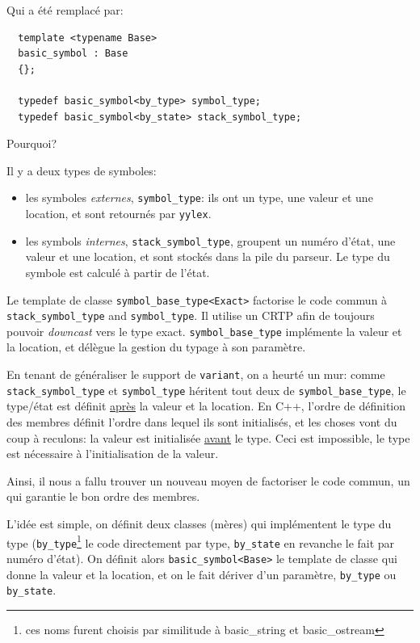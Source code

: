 \documentclass[a4paper,11pt,twoside,final]{article}
\begin{document}
  Qui a été remplacé par:

  \begin{verbatim}
  template <typename Base>
  basic_symbol : Base
  {};

  typedef basic_symbol<by_type> symbol_type;
  typedef basic_symbol<by_state> stack_symbol_type;
  \end{verbatim}

  Pourquoi?

  Il y a deux types de symboles:
  \begin{itemize}
    \item les symboles \textit{externes}, \texttt{symbol\_type}: ils ont un
      type, une valeur et une location, et sont retournés par \texttt{yylex}.
    \item les symbols \textit{internes}, \texttt{stack\_symbol\_type}, groupent
      un numéro d'état, une valeur et une location, et sont stockés dans la
      pile du parseur. Le type du symbole est calculé à partir de l'état.
  \end{itemize}


  Le template de classe \texttt{symbol\_base\_type<Exact>} factorise le code
  commun à \texttt{stack\_symbol\_type} and \texttt{symbol\_type}.  Il utilise
  un CRTP afin de toujours pouvoir \textit{downcast} vers le type exact.
  \texttt{symbol\_base\_type} implémente la valeur et la location, et délègue
  la gestion du typage à son paramètre.

  En tenant de généraliser le support de \texttt{variant}, on a heurté un mur:
  comme \texttt{stack\_symbol\_type} et \texttt{symbol\_type} héritent tout
  deux de \texttt{symbol\_base\_type}, le type/état est définit
  \underline{après} la valeur et la location. En C++, l'ordre de définition des
  membres définit l'ordre dans lequel ils sont initialisés, et les choses vont
  du coup à reculons: la valeur est initialisée \underline{avant} le type. Ceci
  est impossible, le type est nécessaire à l'initialisation de la valeur.

  Ainsi, il nous a fallu trouver un nouveau moyen de factoriser le code commun,
  un qui garantie le bon ordre des membres.

  L'idée est simple, on définit deux classes (mères) qui implémentent le type
  du type (\texttt{by\_type}\footnote{ces noms furent choisis par similitude à
  basic\_string et basic\_ostream} le code directement par type,
  \texttt{by\_state} en revanche le fait par numéro d'état). On définit alors
  \texttt{basic\_symbol<Base>} le template de classe qui donne la valeur et la
  location, et on le fait dériver d'un paramètre, \texttt{by\_type} ou
  \texttt{by\_state}.
\end{document}
